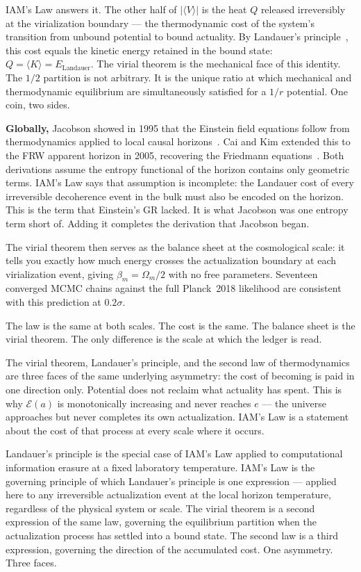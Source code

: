 \documentclass[12pt,a4paper]{article}
\begin{document}
IAM's Law answers it. The other half of $|\langle V \rangle|$ is the
heat $Q$ released irreversibly at the virialization boundary --- the
thermodynamic cost of the system's transition from unbound potential to
bound actuality. By Landauer's principle~\citep{Landauer1961}, this cost
equals the kinetic energy retained in the bound state:
$Q = \langle K \rangle = E_\mathrm{Landauer}$. The virial theorem is the
mechanical face of this identity. The $1/2$ partition is not arbitrary.
It is the unique ratio at which mechanical and thermodynamic equilibrium
are simultaneously satisfied for a $1/r$ potential. One coin, two sides.

\textbf{Globally,} Jacobson showed in 1995 that the Einstein field
equations follow from thermodynamics applied to local causal
horizons~\citep{Jacobson1995}. Cai and Kim extended this to the FRW
apparent horizon in 2005, recovering the Friedmann
equations~\citep{CaiKim2005}. Both derivations assume the entropy
functional of the horizon contains only geometric terms. IAM's Law says
that assumption is incomplete: the Landauer cost of every irreversible
decoherence event in the bulk must also be encoded on the horizon. This
is the term that Einstein's GR lacked. It is what Jacobson was one
entropy term short of. Adding it completes the derivation that Jacobson
began.

The virial theorem then serves as the balance sheet at the cosmological
scale: it tells you exactly how much energy crosses the actualization
boundary at each virialization event, giving $\beta_m = \Omega_m/2$ with
no free parameters. Seventeen converged MCMC chains against the full
Planck~2018 likelihood are consistent with this prediction at $0.2\sigma$.

The law is the same at both scales. The cost is the same. The balance
sheet is the virial theorem. The only difference is the scale at which
the ledger is read.

The virial theorem, Landauer's principle, and the second law of
thermodynamics are three faces of the same underlying asymmetry: the
cost of becoming is paid in one direction only. Potential does not
reclaim what actuality has spent. This is why $\mathcal{E}(a)$ is
monotonically increasing and never reaches $e$ --- the universe
approaches but never completes its own actualization. IAM's Law is a
statement about the cost of that process at every scale where it occurs.

Landauer's principle is the special case of IAM's Law applied to
computational information erasure at a fixed laboratory temperature.
IAM's Law is the governing principle of which Landauer's principle is
one expression --- applied here to any irreversible actualization event
at the local horizon temperature, regardless of the physical system or
scale. The virial theorem is a second expression of the same law,
governing the equilibrium partition when the actualization process has
settled into a bound state. The second law is a third expression,
governing the direction of the accumulated cost. One asymmetry. Three
faces.
\end{document}
